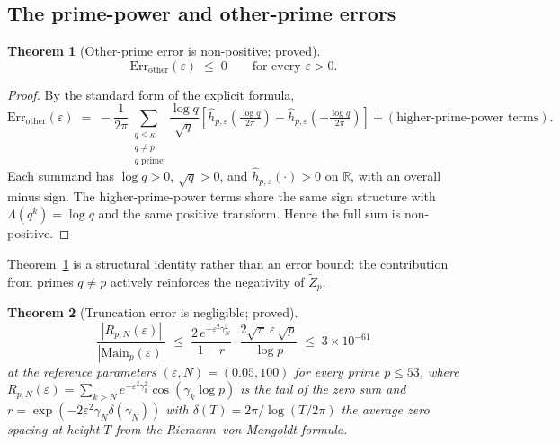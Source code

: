 \documentclass[11pt]{article}
\newtheorem{theorem}{Theorem}[section]
\newcommand{\Zt}{\widetilde{Z}}
\begin{document}
\subsection{The prime-power and other-prime errors}

\begin{theorem}[Other-prime error is non-positive; proved]
\label{thm:other}
\[
\mathrm{Err}_{\mathrm{other}}(\varepsilon) \;\le\; 0 \qquad
\text{for every } \varepsilon>0.
\]
\end{theorem}

\begin{proof}
By the standard form of the explicit formula,
\[
\mathrm{Err}_{\mathrm{other}}(\varepsilon) \;=\; -\frac{1}{2\pi}
\sum_{\substack{q\le\kappa\\ q\neq p\\ q\text{ prime}}}
\frac{\log q}{\sqrt q}
\!\left[\widehat{h}_{p,\varepsilon}\!\left(\tfrac{\log q}{2\pi}\right)
      +\widehat{h}_{p,\varepsilon}\!\left(-\tfrac{\log q}{2\pi}\right)
\right]
+ (\text{higher-prime-power terms}).
\]
Each summand has $\log q>0$, $\sqrt q>0$, and
$\widehat{h}_{p,\varepsilon}(\cdot)>0$ on $\mathbb R$, with an overall
minus sign.
The higher-prime-power terms share the same sign structure with
$\Lambda(q^k)=\log q$ and the same positive transform.
Hence the full sum is non-positive.
\end{proof}

Theorem~\ref{thm:other} is a structural identity rather than an error
bound: the contribution from primes $q\neq p$ actively reinforces the
negativity of $\Zt_p$.

\begin{theorem}[Truncation error is negligible; proved]
\label{thm:trunc}
\[
\frac{|R_{p,N}(\varepsilon)|}{|\mathrm{Main}_p(\varepsilon)|}
\;\le\; \frac{2\,e^{-\varepsilon^2\gamma_N^2}}{1-r}
       \cdot\frac{2\sqrt\pi\,\varepsilon\,\sqrt p}{\log p}
\;\le\; 3\times 10^{-61}
\]
at the reference parameters $(\varepsilon,N)=(0.05,100)$ for every
prime $p\le 53$, where $R_{p,N}(\varepsilon)=\sum_{k>N}
e^{-\varepsilon^2\gamma_k^2}\cos(\gamma_k\log p)$ is the tail of the
zero sum and $r=\exp(-2\varepsilon^2\gamma_N\delta(\gamma_N))$
with $\delta(T)=2\pi/\log(T/2\pi)$ the average zero spacing at
height $T$ from the Riemann--von-Mangoldt formula.
\end{theorem}
\end{document}

